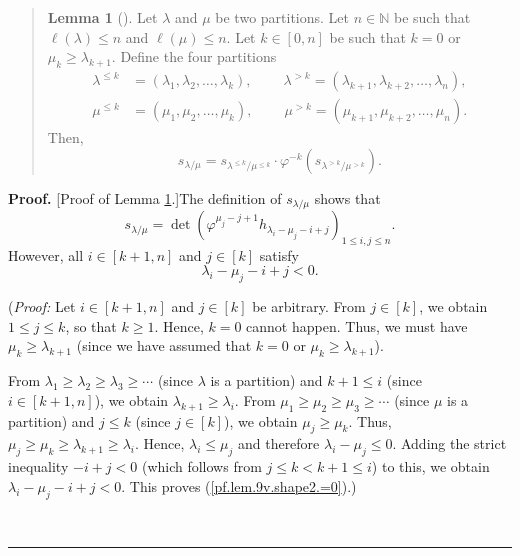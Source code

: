 \documentclass[numbers=enddot,12pt,final,onecolumn,notitlepage]{scrartcl}%
\newenvironment{statement}{\begin{quote}}{\end{quote}}
\theoremstyle{definition}
\newtheorem{lem}[theo]{Lemma}
\newenvironment{lemmain}[1][]
{\begin{statement}\begin{lem}[#1]}
{\end{lem}\end{statement}}
\newenvironment{proof}[1][Proof]{\noindent\textbf{#1.} }{\ \rule{0.5em}{0.5em}}
\newenvironment{lemmain}[1][Proof]{\noindent\textbf{#1.} }{\ \rule{0.5em}{0.5em}}
\begin{document}
\begin{enumerate}
\begin{lemmain}
\label{lem.9v.shape2}Let $\lambda$ and $\mu$ be two partitions. Let
$n\in\mathbb{N}$ be such that $\ell\left(  \lambda\right)  \leq n$ and
$\ell\left(  \mu\right)  \leq n$. Let $k\in\left[  0,n\right]  $ be such that
$k=0$ or $\mu_{k}\geq\lambda_{k+1}$. Define the four partitions%
\begin{align*}
\lambda^{\leq k}  &  =\left(  \lambda_{1},\lambda_{2},\ldots,\lambda
_{k}\right)  ,\ \ \ \ \ \ \ \ \ \ \lambda^{>k}=\left(  \lambda_{k+1}%
,\lambda_{k+2},\ldots,\lambda_{n}\right)  ,\\
\mu^{\leq k}  &  =\left(  \mu_{1},\mu_{2},\ldots,\mu_{k}\right)
,\ \ \ \ \ \ \ \ \ \ \mu^{>k}=\left(  \mu_{k+1},\mu_{k+2},\ldots,\mu
_{n}\right)  .
\end{align*}
Then,%
\[
s_{\lambda/\mu}=s_{\lambda^{\leq k}/\mu^{\leq k}}\cdot\varphi^{-k}\left(
s_{\lambda^{>k}/\mu^{>k}}\right)  .
\]

\end{lemmain}

\begin{proof}
[Proof of Lemma \ref{lem.9v.shape2}.]The definition of $s_{\lambda/\mu}$ shows
that%
\begin{equation}
s_{\lambda/\mu}=\det\left(  \varphi^{\mu_{j}-j+1}h_{\lambda_{i}-\mu_{j}%
-i+j}\right)  _{1\leq i,j\leq n}. \label{pf.lem.9v.shape2.s=1}%
\end{equation}
However, all $i\in\left[  k+1,n\right]  $ and $j\in\left[  k\right]  $ satisfy%
\begin{equation}
\lambda_{i}-\mu_{j}-i+j<0. \label{pf.lem.9v.shape2.=0}%
\end{equation}


(\textit{Proof:} Let $i\in\left[  k+1,n\right]  $ and $j\in\left[  k\right]  $
be arbitrary. From $j\in\left[  k\right]  $, we obtain $1\leq j\leq k$, so
that $k\geq1$. Hence, $k=0$ cannot happen. Thus, we must have $\mu_{k}%
\geq\lambda_{k+1}$ (since we have assumed that $k=0$ or $\mu_{k}\geq
\lambda_{k+1}$).

From $\lambda_{1}\geq\lambda_{2}\geq\lambda_{3}\geq\cdots$ (since $\lambda$ is
a partition) and $k+1\leq i$ (since $i\in\left[  k+1,n\right]  $), we obtain
$\lambda_{k+1}\geq\lambda_{i}$. From $\mu_{1}\geq\mu_{2}\geq\mu_{3}\geq\cdots$
(since $\mu$ is a partition) and $j\leq k$ (since $j\in\left[  k\right]  $),
we obtain $\mu_{j}\geq\mu_{k}$. Thus, $\mu_{j}\geq\mu_{k}\geq\lambda_{k+1}%
\geq\lambda_{i}$. Hence, $\lambda_{i}\leq\mu_{j}$ and therefore $\lambda
_{i}-\mu_{j}\leq0$. Adding the strict inequality $-i+j<0$ (which follows from
$j\leq k<k+1\leq i$) to this, we obtain $\lambda_{i}-\mu_{j}-i+j<0$. This
proves (\ref{pf.lem.9v.shape2.=0}).)


\end{proof}
\end{enumerate}
\end{document}
